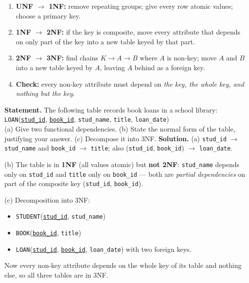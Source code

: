 \documentclass[11pt]{article}
\begin{document}
\begin{methode}
\begin{enumerate}
\item \textbf{UNF $\rightarrow$ 1NF:} remove repeating groups; give every row atomic values; choose a primary key.
\item \textbf{1NF $\rightarrow$ 2NF:} if the key is composite, move every attribute that depends on only part of the key into a new table keyed by that part.
\item \textbf{2NF $\rightarrow$ 3NF:} find chains $K \rightarrow A \rightarrow B$ where $A$ is non-key; move $A$ and $B$ into a new table keyed by $A$, leaving $A$ behind as a foreign key.
\item \textbf{Check:} every non-key attribute must depend on \emph{the key, the whole key, and nothing but the key}.
\end{enumerate}
\end{methode}

\begin{exoresolu}
\textbf{Statement.} The following table records book loans in a school library:\\[2pt]
\texttt{LOAN}(\underline{\texttt{stud\_id}}, \underline{\texttt{book\_id}}, \texttt{stud\_name}, \texttt{title}, \texttt{loan\_date})\\[4pt]
(a) Give two functional dependencies. (b) State the normal form of the table, justifying your answer. (c) Decompose it into 3NF.
\tcblower
\textbf{Solution.}
(a) \texttt{stud\_id} $\rightarrow$ \texttt{stud\_name} and \texttt{book\_id} $\rightarrow$ \texttt{title}; also (\texttt{stud\_id}, \texttt{book\_id}) $\rightarrow$ \texttt{loan\_date}.

(b) The table is in \textbf{1NF} (all values atomic) but \textbf{not 2NF}: \texttt{stud\_name} depends only on \texttt{stud\_id} and \texttt{title} only on \texttt{book\_id} — both are \emph{partial dependencies} on part of the composite key (\texttt{stud\_id}, \texttt{book\_id}).

(c) Decomposition into 3NF:
\begin{itemize}
\item \texttt{STUDENT}(\underline{\texttt{stud\_id}}, \texttt{stud\_name})
\item \texttt{BOOK}(\underline{\texttt{book\_id}}, \texttt{title})
\item \texttt{LOAN}(\underline{\texttt{stud\_id}}, \underline{\texttt{book\_id}}, \texttt{loan\_date}) with two foreign keys.
\end{itemize}
Now every non-key attribute depends on the whole key of its table and nothing else, so all three tables are in 3NF.
\end{exoresolu}
\end{document}
